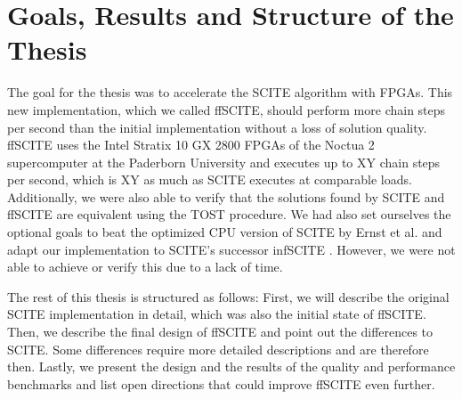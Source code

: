 \section{Goals, Results and Structure of the Thesis}


The goal for the thesis was to accelerate the SCITE algorithm with FPGAs. This new implementation, which we called \ac{ffSCITE}, should perform more chain steps per second than the initial implementation without a loss of solution quality. ffSCITE uses the Intel Stratix 10 GX 2800 FPGAs of the Noctua 2 supercomputer at the Paderborn University and executes up to XY chain steps per second, which is XY as much as SCITE executes at comparable loads. Additionally, we were also able to verify that the solutions found by \ac{SCITE} and \ac{ffSCITE} are equivalent using the \ac{TOST} \cite{schuirmann1987comparison} procedure. We had also set ourselves the optional goals to beat the optimized CPU version of \ac{SCITE} by Ernst et al. \cite{ernst2020Performance} and adapt our implementation to \ac{SCITE}'s successor \ac{infSCITE} \cite{kuipers2017single}. However, we were not able to achieve or verify this due to a lack of time.

The rest of this thesis is structured as follows: First, we will describe the original \ac{SCITE} implementation in detail, which was also the initial state of \ac{ffSCITE}. Then, we describe the final design of \ac{ffSCITE} and point out the differences to \ac{SCITE}. Some differences require more detailed descriptions and are therefore then. Lastly, we present the design and the results of the quality and performance benchmarks and list open directions that could improve \ac{ffSCITE} even further.

